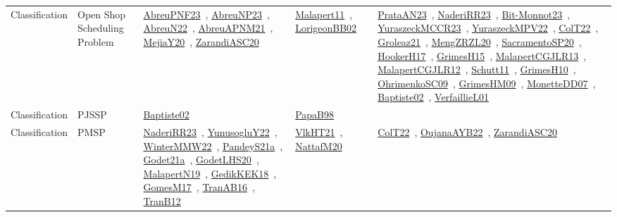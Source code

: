 {\begin{longtable}{lp{3cm}>{\raggedright\arraybackslash}p{6cm}>{\raggedright\arraybackslash}p{6cm}>{\raggedright\arraybackslash}p{8cm}}
Classification & Open Shop Scheduling Problem & \href{../works/AbreuPNF23.pdf}{AbreuPNF23}~\cite{AbreuPNF23}, \href{../works/AbreuNP23.pdf}{AbreuNP23}~\cite{AbreuNP23}, \href{../works/AbreuN22.pdf}{AbreuN22}~\cite{AbreuN22}, \href{../works/AbreuAPNM21.pdf}{AbreuAPNM21}~\cite{AbreuAPNM21}, \href{../works/MejiaY20.pdf}{MejiaY20}~\cite{MejiaY20}, \href{../works/ZarandiASC20.pdf}{ZarandiASC20}~\cite{ZarandiASC20} & \href{../works/Malapert11.pdf}{Malapert11}~\cite{Malapert11}, \href{../works/LorigeonBB02.pdf}{LorigeonBB02}~\cite{LorigeonBB02} & \href{../works/PrataAN23.pdf}{PrataAN23}~\cite{PrataAN23}, \href{../works/NaderiRR23.pdf}{NaderiRR23}~\cite{NaderiRR23}, \href{../works/Bit-Monnot23.pdf}{Bit-Monnot23}~\cite{Bit-Monnot23}, \href{../works/YuraszeckMCCR23.pdf}{YuraszeckMCCR23}~\cite{YuraszeckMCCR23}, \href{../works/YuraszeckMPV22.pdf}{YuraszeckMPV22}~\cite{YuraszeckMPV22}, \href{../works/ColT22.pdf}{ColT22}~\cite{ColT22}, \href{../works/Groleaz21.pdf}{Groleaz21}~\cite{Groleaz21}, \href{../works/MengZRZL20.pdf}{MengZRZL20}~\cite{MengZRZL20}, \href{../works/SacramentoSP20.pdf}{SacramentoSP20}~\cite{SacramentoSP20}, \href{../works/HookerH17.pdf}{HookerH17}~\cite{HookerH17}, \href{../works/GrimesH15.pdf}{GrimesH15}~\cite{GrimesH15}, \href{../works/MalapertCGJLR13.pdf}{MalapertCGJLR13}~\cite{MalapertCGJLR13}, \href{../works/MalapertCGJLR12.pdf}{MalapertCGJLR12}~\cite{MalapertCGJLR12}, \href{../works/Schutt11.pdf}{Schutt11}~\cite{Schutt11}, \href{../works/GrimesH10.pdf}{GrimesH10}~\cite{GrimesH10}, \href{../works/OhrimenkoSC09.pdf}{OhrimenkoSC09}~\cite{OhrimenkoSC09}, \href{../works/GrimesHM09.pdf}{GrimesHM09}~\cite{GrimesHM09}, \href{../works/MonetteDD07.pdf}{MonetteDD07}~\cite{MonetteDD07}, \href{../works/Baptiste02.pdf}{Baptiste02}~\cite{Baptiste02}, \href{../works/VerfaillieL01.pdf}{VerfaillieL01}~\cite{VerfaillieL01}\\
Classification & PJSSP & \href{../works/Baptiste02.pdf}{Baptiste02}~\cite{Baptiste02} & \href{../works/PapaB98.pdf}{PapaB98}~\cite{PapaB98} & \\
Classification & PMSP & \href{../works/NaderiRR23.pdf}{NaderiRR23}~\cite{NaderiRR23}, \href{../works/YunusogluY22.pdf}{YunusogluY22}~\cite{YunusogluY22}, \href{../works/WinterMMW22.pdf}{WinterMMW22}~\cite{WinterMMW22}, \href{../works/PandeyS21a.pdf}{PandeyS21a}~\cite{PandeyS21a}, \href{../works/Godet21a.pdf}{Godet21a}~\cite{Godet21a}, \href{../works/GodetLHS20.pdf}{GodetLHS20}~\cite{GodetLHS20}, \href{../works/MalapertN19.pdf}{MalapertN19}~\cite{MalapertN19}, \href{../works/GedikKEK18.pdf}{GedikKEK18}~\cite{GedikKEK18}, \href{../works/GomesM17.pdf}{GomesM17}~\cite{GomesM17}, \href{../works/TranAB16.pdf}{TranAB16}~\cite{TranAB16}, \href{../works/TranB12.pdf}{TranB12}~\cite{TranB12} & \href{../works/VlkHT21.pdf}{VlkHT21}~\cite{VlkHT21}, \href{../works/NattafM20.pdf}{NattafM20}~\cite{NattafM20} & \href{../works/ColT22.pdf}{ColT22}~\cite{ColT22}, \href{../works/OujanaAYB22.pdf}{OujanaAYB22}~\cite{OujanaAYB22}, \href{../works/ZarandiASC20.pdf}{ZarandiASC20}~\cite{ZarandiASC20}\\

\end{longtable}}
